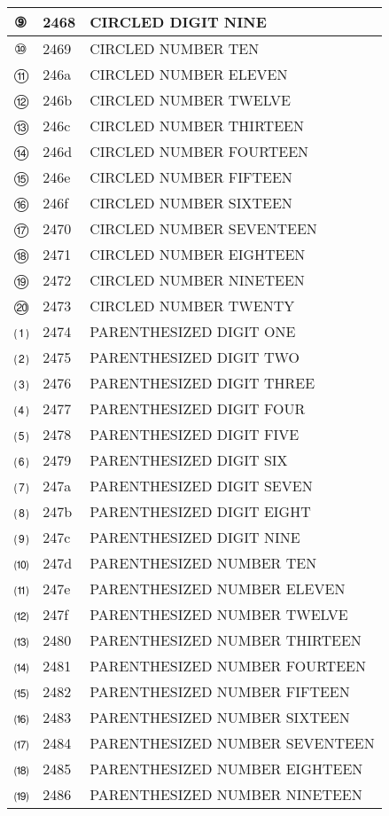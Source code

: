 \documentclass[12pt,letterpaper,openany]{book}
\begin{document}
\begin{center}
\begin{supertabular}{|m{0.25in}|m{0.5in}|m{4in}|}
⑨ & 2468 & CIRCLED DIGIT NINE\\\hline
⑩ & 2469 & CIRCLED NUMBER TEN\\\hline
⑪ & 246a & CIRCLED NUMBER ELEVEN\\\hline
⑫ & 246b & CIRCLED NUMBER TWELVE\\\hline
⑬ & 246c & CIRCLED NUMBER THIRTEEN\\\hline
⑭ & 246d & CIRCLED NUMBER FOURTEEN\\\hline
⑮ & 246e & CIRCLED NUMBER FIFTEEN\\\hline
⑯ & 246f & CIRCLED NUMBER SIXTEEN\\\hline
⑰ & 2470 & CIRCLED NUMBER SEVENTEEN\\\hline
⑱ & 2471 & CIRCLED NUMBER EIGHTEEN\\\hline
⑲ & 2472 & CIRCLED NUMBER NINETEEN\\\hline
⑳ & 2473 & CIRCLED NUMBER TWENTY\\\hline
⑴ & 2474 & PARENTHESIZED DIGIT ONE\\\hline
⑵ & 2475 & PARENTHESIZED DIGIT TWO\\\hline
⑶ & 2476 & PARENTHESIZED DIGIT THREE\\\hline
⑷ & 2477 & PARENTHESIZED DIGIT FOUR\\\hline
⑸ & 2478 & PARENTHESIZED DIGIT FIVE\\\hline
⑹ & 2479 & PARENTHESIZED DIGIT SIX\\\hline
⑺ & 247a & PARENTHESIZED DIGIT SEVEN\\\hline
⑻ & 247b & PARENTHESIZED DIGIT EIGHT\\\hline
⑼ & 247c & PARENTHESIZED DIGIT NINE\\\hline
⑽ & 247d & PARENTHESIZED NUMBER TEN\\\hline
⑾ & 247e & PARENTHESIZED NUMBER ELEVEN\\\hline
⑿ & 247f & PARENTHESIZED NUMBER TWELVE\\\hline
⒀ & 2480 & PARENTHESIZED NUMBER THIRTEEN\\\hline
⒁ & 2481 & PARENTHESIZED NUMBER FOURTEEN\\\hline
⒂ & 2482 & PARENTHESIZED NUMBER FIFTEEN\\\hline
⒃ & 2483 & PARENTHESIZED NUMBER SIXTEEN\\\hline
⒄ & 2484 & PARENTHESIZED NUMBER SEVENTEEN\\\hline
⒅ & 2485 & PARENTHESIZED NUMBER EIGHTEEN\\\hline
⒆ & 2486 & PARENTHESIZED NUMBER NINETEEN\\\hline

\end{supertabular}
\end{center}
\end{document}
